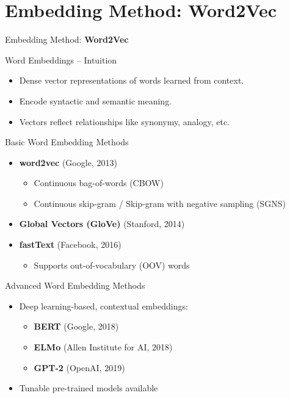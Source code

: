 \section{Embedding Method: Word2Vec}
\begin{frame}{}
    \LARGE Embedding Method: \textbf{Word2Vec}
\end{frame}

\begin{frame}{Word Embeddings – Intuition}
    \begin{itemize}
        \item Dense vector representations of words learned from context.
        \item Encode syntactic and semantic meaning.
        \item Vectors reflect relationships like synonymy, analogy, etc.
    \end{itemize}
\end{frame}

\begin{frame}{Basic Word Embedding Methods}
    \begin{itemize}
        \item \textbf{word2vec} (Google, 2013)
        \begin{itemize}
            \item Continuous bag-of-words (CBOW)
            \item Continuous skip-gram / Skip-gram with negative sampling (SGNS)
        \end{itemize}
        \item \textbf{Global Vectors (GloVe)} (Stanford, 2014)
        \item \textbf{fastText} (Facebook, 2016)
        \begin{itemize}
            \item Supports out-of-vocabulary (OOV) words
        \end{itemize}
    \end{itemize}
\end{frame}

\begin{frame}{Advanced Word Embedding Methods}
    \begin{itemize}
        \item Deep learning-based, contextual embeddings:
        \begin{itemize}
            \item \textbf{BERT} (Google, 2018)
            \item \textbf{ELMo} (Allen Institute for AI, 2018)
            \item \textbf{GPT-2} (OpenAI, 2019)
        \end{itemize}
        \item Tunable pre-trained models available
    \end{itemize}
\end{frame}

